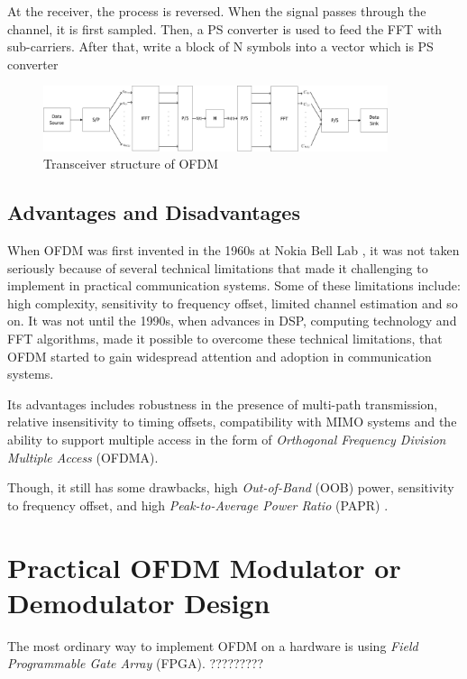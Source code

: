 \documentclass{article}
\numberwithin{figure}{section}
\numberwithin{equation}{section}
\begin{document}
At the receiver, the process is reversed. When the signal passes through the channel, it is first sampled. Then, a PS converter is used to feed the FFT with sub-carriers. After that, write a block of N symbols into a vector which is PS converter

\begin{figure}[!ht]
  \centering
  \includegraphics[width=0.9\textwidth]{images/OFDM_transceiver.pdf}
  \caption{Transceiver structure of OFDM}
  \label{fig:Transceiver structure}
\end{figure}

\subsection{Advantages and Disadvantages}
When OFDM was first invented in the 1960s at Nokia Bell Lab \cite{RN82}, it was not taken seriously because of several technical limitations that made it challenging to implement in practical communication systems. Some of these limitations include: high complexity, sensitivity to frequency offset, limited channel estimation and so on. It was not until the 1990s, when advances in DSP, computing technology and FFT algorithms, made it possible to overcome these technical limitations, that OFDM started to gain widespread attention and adoption in communication systems. 

Its advantages includes robustness in the presence of multi-path transmission, relative insensitivity to timing offsets, compatibility with MIMO systems and the ability to support multiple access in the form of \textit{Orthogonal Frequency Division Multiple Access} (OFDMA). 

Though, it still has some drawbacks, high \textit{Out-of-Band} (OOB) power, sensitivity to frequency offset, and high \textit{Peak-to-Average Power Ratio} (PAPR) \cite{RN81}.

\section{Practical OFDM Modulator or Demodulator Design}
The most ordinary way to implement OFDM on a hardware is using \textit{Field Programmable Gate Array} (FPGA).
?????????
\end{document}
